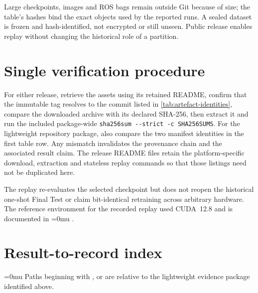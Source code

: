 Large checkpoints, images and ROS bags remain outside Git because of size; the
table's hashes bind the exact objects used by the reported runs. A sealed
dataset is frozen and hash-identified, not encrypted or still unseen. Public
release enables replay without changing the historical role of a partition.

\section{Single verification procedure}

For either release, retrieve the assets using its retained README, confirm that
the immutable tag resolves to the commit listed in
\cref{tab:artefact-identities}, compare the downloaded archive with its declared
SHA-256, then extract it and run the included package-wide
\verb|sha256sum --strict -c SHA256SUMS|. For the lightweight repository package,
also compare the two manifest identities in the first table row. Any mismatch
invalidates the provenance chain and the associated result claim. The release
README files retain the platform-specific download, extraction and stateless
replay commands so that those listings need not be duplicated here.

The replay re-evaluates the selected checkpoint but does not reopen the
historical one-shot Final Test or claim bit-identical retraining across arbitrary
hardware. The reference environment for the recorded replay used CUDA~12.8
\citep{cuda} and is documented in
{\def\UrlBreaks{\do\/\do\_}\def\UrlBigBreaks{}\Urlmuskip=0mu\relax%
}.

\section{Result-to-record index}

\begingroup
\def\UrlBreaks{\do\/\do\_}
\def\UrlBigBreaks{}
\Urlmuskip=0mu\relax
Paths beginning with ,  or  are
relative to the lightweight evidence package identified above.

